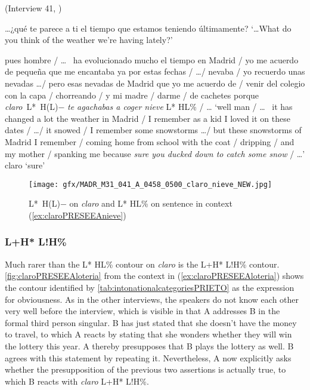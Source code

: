 \begin{exe}
	\ex \label{ex:claroPRESEEAnieve} (Interview 41, \cite{PRESEEA.20142020})
	\begin{xlist}[A:]
	 \ldots ¿qué te parece a ti el tiempo que estamos teniendo últimamente?
	\glt `\ldots What do you think of the weather we're having lately?'

	 pues hombre / \ldots~ ha evolucionado mucho el tiempo en Madrid / yo me acuerdo de pequeña que me encantaba ya por estas fechas / \ldots / nevaba / yo recuerdo unas nevadas \ldots / pero esas nevadas de Madrid que yo me acuerdo de / venir del colegio con la capa / chorreando / y mi madre / darme / de cachetes porque \textit{claro}~L*~H(L)$-$ \textit{te agachabas a coger nieve} L* HL\% / \ldots\pagebreak
	\glt `well man / \ldots~ it has changed a lot the weather in Madrid / I remember as a kid I loved it on these dates / \ldots / it snowed / I remember some snowstorms  \ldots / but these snowstorms of Madrid I remember / coming home from school with the coat / dripping / and my mother / spanking me because \textit{sure you ducked down to catch some snow} / \ldots'
	 claro 
	\glt `sure'
	\end{xlist}
\end{exe}

\begin{figure}
	\texttt{[image: gfx/MADR\_M31\_041\_A\_0458\_0500\_claro\_nieve\_NEW.jpg]}
	\caption{L*~H(L)$-$ on \textit{claro} and L* HL\% on sentence in context (\ref{ex:claroPRESEEAnieve}) \href{https://osf.io/9r84u/}{\faVolumeUp} \label{fig:claroPRESEEAnieve}}
\end{figure}


\subsubsection{L+H* L!H\%}

Much rarer than the L* HL\% contour on \textit{claro} is the L+H* L!H\% contour. \autoref{fig:claroPRESEEAloteria} from the context in (\ref{ex:claroPRESEEAloteria}) shows the contour identified by \autoref{tab:intonationalcategoriesPRIETO} as the expression for obviousness. As in the other interviews, the speakers do not know each other very well before the interview, which is visible in that A addresses B in the formal third person singular. B has just stated that she doesn't have the money to travel, to which A reacts by stating that she wonders whether they will win the lottery this year. A thereby presupposes that B plays the lottery as well. B agrees with this statement by repeating it. Nevertheless, A now explicitly asks whether the presupposition of the previous two assertions is actually true, to which B reacts with \textit{claro} L+H* L!H\%.

